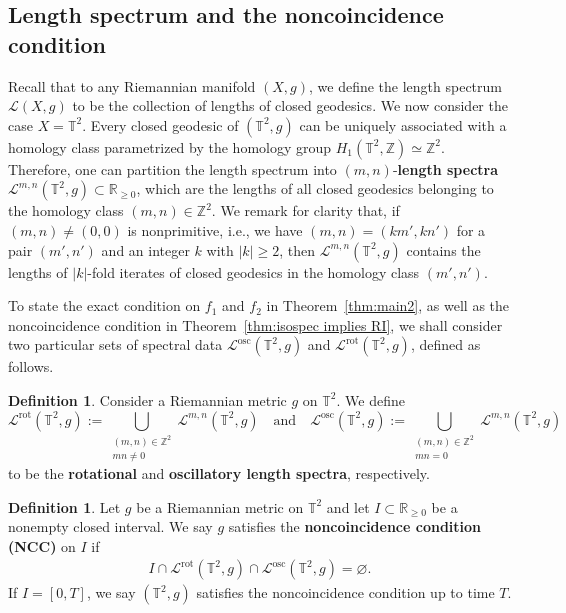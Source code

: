 \documentclass[11pt,letterpaper,oneside]{amsart}
\newcommand{\Z}{\mathbb{Z}}
\newcommand{\R}{\mathbb{R}}
\newcommand{\T}{\mathbb{T}}
\theoremstyle{definition}
\newtheorem{def1}[theo]{Definition}
\theoremstyle{remark}
\theoremstyle{definition}
\theoremstyle{remark}
\newcommand{\CL}{\mathcal{L}}
\DeclareMathOperator{\rot}{rot}
\DeclareMathOperator{\osc}{osc}
\newcommand{\et}{\quad \text{and} \quad}
\begin{document}
\subsection{Length spectrum and the noncoincidence condition}
Recall that to any Riemannian manifold $(X,g)$, we define the length spectrum $\CL(X,g)$ to be the collection of lengths of closed geodesics. 
We now consider the case $X = \T^2$. 
Every closed geodesic of $(\T^2, g)$ can be uniquely associated with a homology class parametrized by the homology group $H_1(\T^2, \Z) \simeq \Z^2$.
Therefore, one can partition the length spectrum into $(m,n)$-\textbf{length spectra} $\CL^{m,n}(\T^2,g) \subset \R_{\geq 0}$, which are the lengths of all closed geodesics belonging to the homology class $(m,n) \in \Z^2$.
We remark for clarity that, if $(m,n) \neq (0,0)$ is nonprimitive, i.e., we have $(m,n) = (km',kn')$ for a pair $(m',n')$ and an integer $k$ with $|k| \geq 2$, then $\CL^{m,n}(\T^2,g)$ contains the lengths of $|k|$-fold iterates of closed geodesics in the homology class $(m',n')$.

\medskip

To state the exact condition on $f_1$ and $f_2$ in Theorem~\ref{thm:main2}, as well as the noncoincidence condition in Theorem~\ref{thm:isospec implies RI}, we shall consider two particular sets of spectral data $\CL^{\osc}(\T^2,g)$ and $\CL^{\rot}(\T^2,g)$, defined as follows.

\begin{def1} \label{def:osc Lsp}
    Consider a Riemannian metric $g$ on $\T^2$. We define
    \begin{equation}\label{osc Lsp}
        \CL^{\rot}(\T^2,g) := \bigcup_{\substack{(m,n) \in \Z^2\\ mn \neq 0}} \CL^{m,n}(\T^2,g)
        \et
        \CL^{\osc}(\T^2,g) := \bigcup_{\substack{(m,n) \in \Z^2\\ mn = 0}} \CL^{m,n}(\T^2,g)
    \end{equation}
    to be the \textbf{rotational} and \textbf{oscillatory length spectra}, respectively. 
\end{def1}


\begin{def1}\label{def:NCC}
    Let $g$ be a Riemannian metric on $\T^2$ and let $I \subset \R_{\geq 0}$ be a nonempty closed interval. 
    We say $g$ satisfies the \textbf{noncoincidence condition (NCC)} on $I$ if
    \begin{align}\label{eq:INCC}
     I \cap \CL^{\rot}(\T^2,g) \cap   \CL^{\osc}(\T^2,g) = \varnothing.
    \end{align}
    If $I = [0,T]$, we say $(\T^2,g)$ satisfies the noncoincidence condition up to time $T$.
\end{def1}
\end{document}
